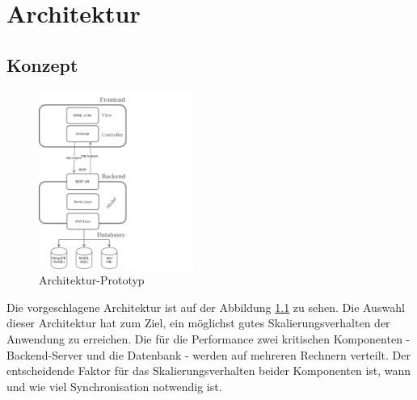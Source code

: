 \chapter{Architektur}

\section{Konzept}


\begin{figure}[H]
\vspace{-30pt}%
\centering
\includegraphics[trim = 0mm 0mm 0mm 0mm, clip, width=0.45\textwidth]{resources/architectureMyAppWithoutFrameworks}
\caption[Architektur-Prototyp]{Architektur-Prototyp}
\label{img:architectureMyApp}
\end{figure}

Die vorgeschlagene Architektur ist auf der Abbildung \ref{img:architectureMyApp} zu sehen. Die Auswahl dieser Architektur hat zum Ziel, ein möglichst gutes Skalierungsverhalten der Anwendung zu erreichen. Die für die Performance zwei kritischen Komponenten - Backend-Server und die Datenbank - werden auf mehreren Rechnern verteilt. Der entscheidende Faktor für das Skalierungsverhalten beider Komponenten ist, wann und wie viel Synchronisation notwendig ist. 

